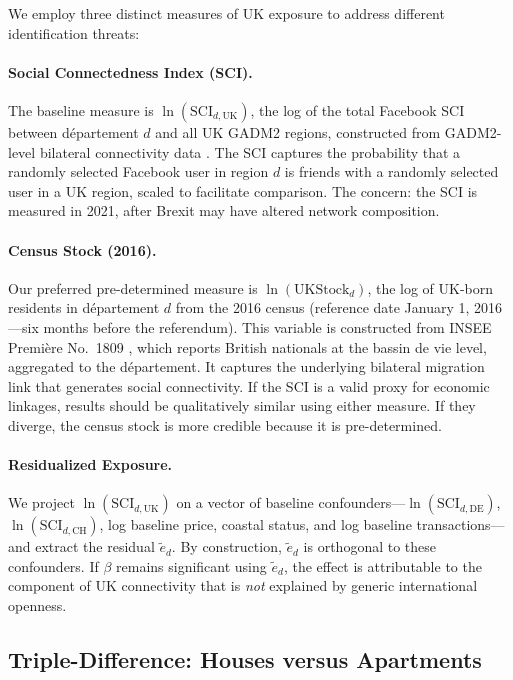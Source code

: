 \documentclass[12pt]{article}
\begin{document}
We employ three distinct measures of UK exposure to address different identification threats:

\paragraph{Social Connectedness Index (SCI).} The baseline measure is $\ln(\text{SCI}_{d,\text{UK}})$, the log of the total Facebook SCI between d\'epartement $d$ and all UK GADM2 regions, constructed from GADM2-level bilateral connectivity data \citep{bailey2018social}. The SCI captures the probability that a randomly selected Facebook user in region $d$ is friends with a randomly selected user in a UK region, scaled to facilitate comparison. The concern: the SCI is measured in 2021, after Brexit may have altered network composition.

\paragraph{Census Stock (2016).} Our preferred pre-determined measure is $\ln(\text{UKStock}_{d})$, the log of UK-born residents in d\'epartement $d$ from the 2016 census (reference date January 1, 2016---six months before the referendum). This variable is constructed from INSEE Premi\`ere No.\ 1809 \citep{insee2019premiere}, which reports British nationals at the bassin de vie level, aggregated to the d\'epartement. It captures the underlying bilateral migration link that generates social connectivity. If the SCI is a valid proxy for economic linkages, results should be qualitatively similar using either measure. If they diverge, the census stock is more credible because it is pre-determined.

\paragraph{Residualized Exposure.} We project $\ln(\text{SCI}_{d,\text{UK}})$ on a vector of baseline confounders---$\ln(\text{SCI}_{d,\text{DE}})$, $\ln(\text{SCI}_{d,\text{CH}})$, log baseline price, coastal status, and log baseline transactions---and extract the residual $\tilde{e}_d$. By construction, $\tilde{e}_d$ is orthogonal to these confounders. If $\beta$ remains significant using $\tilde{e}_d$, the effect is attributable to the component of UK connectivity that is \textit{not} explained by generic international openness.

\subsection{Triple-Difference: Houses versus Apartments}\label{subsec:triple}
\end{document}
